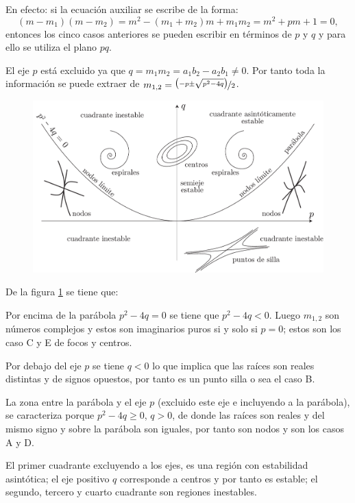 \documentclass[a5paper,doc,10pt,noapacite]{apa6}
\begin{document}
{{En efecto: si la ecuación auxiliar se escribe de la forma:
\[
(m-m_1)(m-m_2)=m^2-(m_1+m_2)m+m_1m_2=m^2+pm+1=0,
\]
entonces los cinco casos anteriores se pueden escribir en términos de \(p\) y \(q\) y para ello se utiliza el plano \(pq\).

El eje \(p\) está excluido ya que \(q=m_1m_2=a_1b_2-a_2b_1\neq 0\). Por tanto toda la información se puede extraer de \(m_{1,2}=\nicefrac{\big(-p\pm\sqrt{p^2-4q}\big)}{2}\).
\vspace{-1\baselineskip}
	\begin{figure}[H]
		\captionsetup{justification=centering, labelfont=footnotesize, font=footnotesize}
		\centering
		\includegraphics[scale=0.35]{Graficos/figura17}
	
		\caption{ }
		\label{fig:M-17}
	\end{figure}

De la figura \ref{fig:M-17} se tiene que:
\begin{APAitemize}
	\item Por encima de la parábola \(p^2-4q=0\) se tiene que \(p^2-4q<0\). Luego \(m_{1,2}\) son números 	complejos y estos son imaginarios puros si y solo si \(p=0\); estos son los caso C y E de focos y centros.
	\item Por debajo del eje \(p\) se tiene \(q<0\) lo que implica que las raíces son reales distintas y de signos opuestos, por tanto es un punto silla o sea el caso B.
	\item La zona entre la parábola y el eje \(p\) (excluido este eje e incluyendo a la parábola), se caracteriza porque \(p^2-4q\geq 0\), \(q>0\),  de donde las raíces son reales y del mismo signo y sobre la parábola	son iguales, por tanto son nodos y son los casos A y D.
	\item El primer cuadrante excluyendo a los ejes, es una región con estabilidad asintótica; el eje positivo \(q\) corresponde a centros y por tanto es estable; el segundo, tercero y cuarto cuadrante son regiones inestables.
\end{APAitemize}


}}
\end{document}
